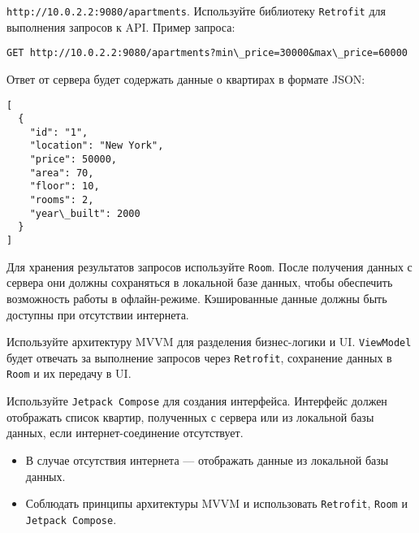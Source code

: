 \documentclass[a4paper,12pt]{article}
\begin{document}
\texttt{http://10.0.2.2:9080/apartments}. Используйте библиотеку \texttt{Retrofit} для выполнения запросов к API. Пример запроса:

\begin{verbatim}
GET http://10.0.2.2:9080/apartments?min\_price=30000&max\_price=60000
\end{verbatim}

Ответ от сервера будет содержать данные о квартирах в формате JSON:

\begin{verbatim}
[
  {
    "id": "1",
    "location": "New York",
    "price": 50000,
    "area": 70,
    "floor": 10,
    "rooms": 2,
    "year\_built": 2000
  }
]
\end{verbatim}

Для хранения результатов запросов используйте \texttt{Room}. После получения данных с сервера они должны сохраняться в локальной базе данных, чтобы обеспечить возможность работы в офлайн-режиме. Кэшированные данные должны быть доступны при отсутствии интернета.

Используйте архитектуру MVVM для разделения бизнес-логики и UI. \texttt{ViewModel} будет отвечать за выполнение запросов через \texttt{Retrofit}, сохранение данных в \texttt{Room} и их передачу в UI.

Используйте \texttt{Jetpack Compose} для создания интерфейса. Интерфейс должен отображать список квартир, полученных с сервера или из локальной базы данных, если интернет-соединение отсутствует.

\begin{itemize}
  \item В случае отсутствия интернета — отображать данные из локальной базы данных.
  \item Соблюдать принципы архитектуры MVVM и использовать \texttt{Retrofit}, \texttt{Room} и \texttt{Jetpack Compose}.
\end{itemize}
\end{document}
